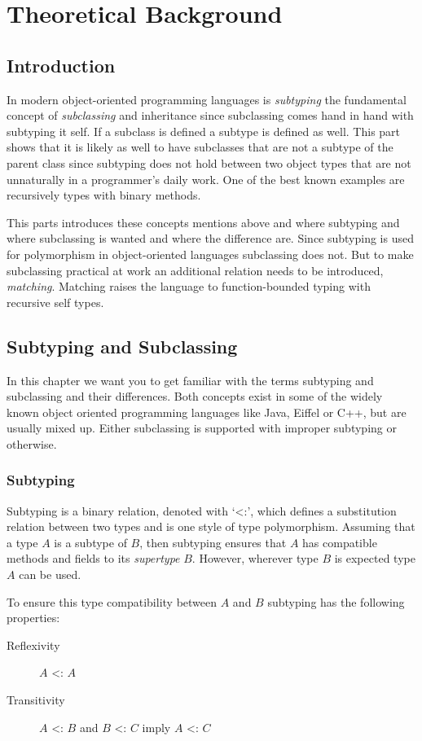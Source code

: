 \part{Theoretical Background}
\chapter{Introduction}
In modern object-oriented programming languages is \emph{subtyping}
the fundamental concept of \emph{subclassing} and inheritance since
subclassing comes hand in hand with subtyping it self. If a subclass
is defined a subtype is defined as well. This part shows that it is
likely as well to have subclasses that are not a subtype of the parent
class since subtyping does not hold between two object types that are
not unnaturally in a programmer's daily work. One of the best known
examples are recursively types with binary methods.

This parts introduces these concepts mentions above and where subtyping
and where subclassing is wanted and where the difference are. Since
subtyping is used for polymorphism in object-oriented languages
subclassing does not. But to make subclassing practical at work an
additional relation needs to be introduced, \emph{matching}. Matching
raises the language to function-bounded typing with recursive self types.

\chapter{Subtyping and Subclassing}
\label{chap:subtypingVsSubclassing}
In this chapter we want you to get familiar with the terms subtyping
and subclassing and their differences. Both concepts exist in some of
the widely known object oriented programming languages like Java, Eiffel
or C++, but are usually mixed up. Either subclassing is supported with
improper subtyping or otherwise.

\section{Subtyping}
Subtyping is a binary relation, denoted with `<:', which defines
a substitution relation between two types and is one style of type
polymorphism. Assuming that a type $A$ is a subtype of $B$, then subtyping
ensures that $A$ has compatible methods and fields to its \emph{supertype}
$B$. However, wherever type $B$ is expected type $A$ can be used.

To ensure this type compatibility between $A$ and $B$ subtyping has the
following properties:
\begin{description}
	\item[Reflexivity] $A$ <: $A$
	\item[Transitivity] $A$ <: $B$ and $B$ <: $C$ imply $A$ <: $C$
\end{description}

